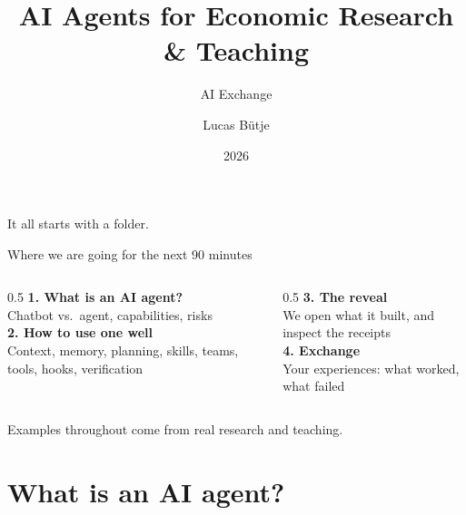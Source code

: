 \documentclass[aspectratio=169, 11pt, t]{beamer}
\title{AI Agents for Economic Research \& Teaching}
\subtitle{AI Exchange}
\author{Lucas Bütje}
\date{2026}
\institute{University of Konstanz}
\begin{document}
{
\maketitle}



\begin{frame}[standout]
  It all starts with a folder.
\end{frame}


\begin{frame}{Where we are going for the next 90 minutes}

\begin{columns}[T]
  \begin{column}{0.5\textwidth}
    \small
    \textbf{\textcolor{seeblau}{1. What is an AI agent?}}\\
    {\footnotesize Chatbot vs.\ agent, capabilities, risks}\\[0.7em]
    \textbf{\textcolor{seeblau}{2. How to use one well}}\\
    {\footnotesize Context, memory, planning, skills, teams, tools, hooks, verification}
  \end{column}
  \begin{column}{0.5\textwidth}
    \small
    \textbf{\textcolor{seeblau}{3. The reveal}}\\
    {\footnotesize We open what it built, and inspect the receipts}\\[0.7em]
    \textbf{\textcolor{seeblau}{4. Exchange}}\\
    {\footnotesize Your experiences: what worked, what failed}
  \end{column}
\end{columns}

\vfill
\centering\small\textcolor{grau}{Examples throughout come from real research and teaching.}

\end{frame}


\section{What is an AI agent?}
\end{document}
